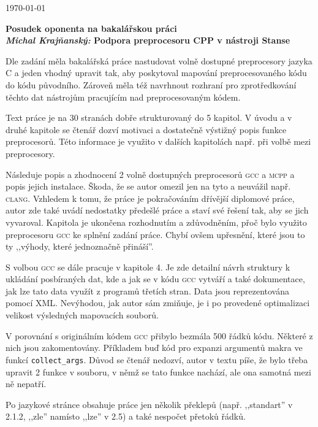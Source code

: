 \documentclass{article}
\begin{document}
\begin{flushright}
\today
\end{flushright}
\begin{center}
\Large\textbf{Posudek oponenta na bakalářskou práci \\
\normalsize%
\textit{Michal Krajňanský:} Podpora preprocesoru CPP v nástroji Stanse}
\end{center}

Dle zadání měla bakalářská práce nastudovat volně dostupné preprocesory jazyka
C a jeden vhodný upravit tak, aby poskytoval mapování preprocesovaného kódu do
kódu původního. Zároveň měla též navrhnout rozhraní pro zprotředkování těchto
dat nástrojům pracujícím nad preprocesovaným kódem.

Text práce je na 30 stranách dobře strukturovaný do 5 kapitol. V úvodu a v
druhé kapitole se čtenář dozví motivaci a dostatečně výstižný popis funkce
preprocesorů. Této informace je využito v dalších kapitolách např. při volbě
mezi preprocesory.

Následuje popis a zhodnocení 2 volně dostupných preprocesorů \textsc{gcc} a
\textsc{mcpp} a popis jejich instalace. Škoda, že se autor omezil jen na tyto
a neuvážil např. \textsc{clang}. Vzhledem k tomu, že práce je pokračováním
dřívější diplomové práce, autor zde také uvádí nedostatky předešlé práce a
staví své řešení tak, aby se jich vyvaroval. Kapitola je ukončena rozhodnutím
a zdůvodněním, přoč bylo využito preprocesoru \textsc{gcc} ke splnění zadání
práce. Chybí ovšem upřesnění, které jsou to ty ,,výhody, které jednoznačně
přináší''.

S volbou \textsc{gcc} se dále pracuje v kapitole 4. Je zde detailní návrh
struktury k ukládání posbíraných dat, kde a jak se v kódu \textsc{gcc} vytváří
a také dokumentace, jak lze tato data využít z programů třetích stran. Data
jsou reprezentována pomocí XML. Nevýhodou, jak autor sám zmiňuje, je i po
provedené optimalizaci velikost výsledných mapovacích souborů.

V porovnání s originálním kódem \textsc{gcc} přibylo bezmála 500 řádků kódu.
Některé z nich jsou zakomentovány.  Příkladem buď kód pro expanzi argumentů
makra ve funkcí \texttt{collect\_args}. Důvod se čtenář nedozví, autor v textu
píše, že bylo třeba upravit 2 funkce v souboru, v němž se tato funkce nachází,
ale ona samotná mezi ně nepatří.

Po jazykové stránce obsahuje práce jen několik překlepů (např. ,,standart'' v
2.1.2, ,,zle'' namísto ,,lze'' v 2.5) a také nespočet přetoků řádků.
\end{document}
